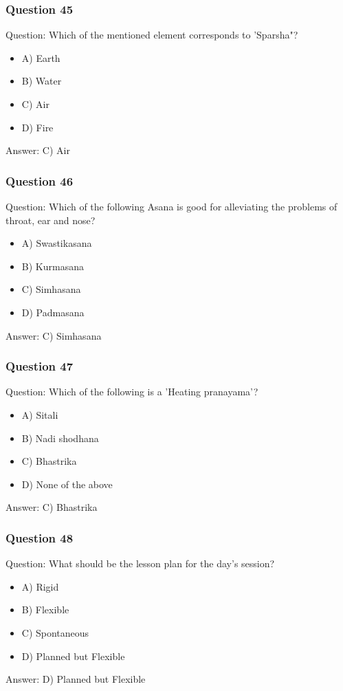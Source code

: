 \begin{frame}[fragile]\frametitle{Question 45}
Question: Which of the mentioned element corresponds to 'Sparsha"?
\begin{itemize}
\item A) Earth
\item B) Water
\item C) Air
\item D) Fire
\end{itemize}
Answer: C) Air
\end{frame}

\begin{frame}[fragile]\frametitle{Question 46}
Question: Which of the following Asana is good for alleviating the problems of throat, ear and nose?
\begin{itemize}
\item A) Swastikasana
\item B) Kurmasana
\item C) Simhasana
\item D) Padmasana
\end{itemize}
Answer: C) Simhasana
\end{frame}

\begin{frame}[fragile]\frametitle{Question 47}
Question: Which of the following is a 'Heating pranayama'?
\begin{itemize}
\item A) Sitali
\item B) Nadi shodhana
\item C) Bhastrika
\item D) None of the above
\end{itemize}
Answer: C) Bhastrika
\end{frame}

\begin{frame}[fragile]\frametitle{Question 48}
Question: What should be the lesson plan for the day's session?
\begin{itemize}
\item A) Rigid
\item B) Flexible
\item C) Spontaneous
\item D) Planned but Flexible
\end{itemize}
Answer: D) Planned but Flexible
\end{frame}

